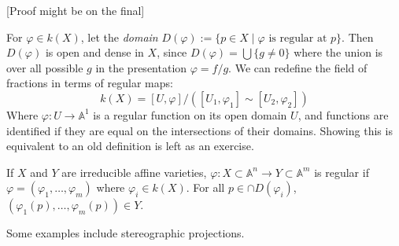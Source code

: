 \documentclass[12pt]{article}
\newcommand{\A}{\mathbb{A}}
\renewcommand{\phi}{\varphi}
\begin{document}
    [Proof might be on the final]\par 
    For $\phi \in k(X)$, let the \textit{domain} $D(\phi) := \{p \in X \mid \phi \text{ is regular at } p \}$. Then $D(\phi)$ is open and dense in $X$, since $D(\phi) = \bigcup \{g \neq 0\}$ where the union is over all possible $g$ in the presentation $\phi = f/g$. We can redefine the field of fractions in terms of regular maps: 
    $$k(X) = [U, \phi]/([U_1, \phi_1] \sim [U_2, \phi_2])$$
    Where $\phi: U \to \A^1$ is a regular function on its open domain $U$, and functions are identified if they are equal on the intersections of their domains. Showing this is equivalent to an old definition is left as an exercise. \par 
    If $X$ and $Y$ are irreducible affine varieties, $\phi: X \subset \A^n \to Y \subset \A^m$ is regular if $\phi = (\phi_1, \dots, \phi_m)$ where $\phi_i \in k(X)$. For all $p \in \cap D(\phi_i)$, $(\phi_1(p), \dots, \phi_m(p)) \in Y$. \par 
    Some examples include stereographic projections. 
\end{document}
